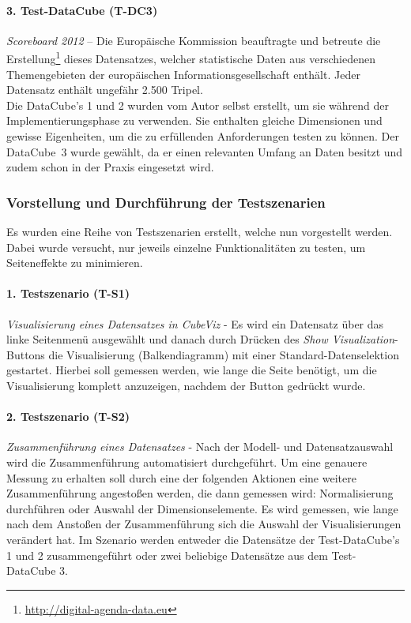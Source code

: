 \documentclass[11pt]{article}
\newcommand{\com}[1]{\marginpar{\em {\small{#1}}}} %
\begin{document}
\paragraph{3. Test-DataCube (T-DC3)} \textit{Scoreboard 2012}\com{T-DC3} -- Die Europäische Kommission beauftragte und betreute die Erstellung\footnote{\url{http://digital-agenda-data.eu}} dieses Datensatzes, welcher statistische Daten aus verschiedenen Themengebieten der europäischen Informationsgesellschaft enthält. Jeder Datensatz enthält ungefähr 2.500 Tripel. \\

\noindent
Die DataCube's 1 und 2 wurden vom Autor selbst erstellt, um sie während der Implementierungsphase zu verwenden. Sie enthalten gleiche Dimensionen und gewisse Eigenheiten, um die zu erfüllenden Anforderungen testen zu können. Der \mbox{DataCube 3} wurde gewählt, da er einen relevanten Umfang an Daten besitzt und zudem schon in der Praxis eingesetzt wird. 


%
%
%
\subsubsection{Vorstellung und Durchführung der Testszenarien}

Es wurden eine Reihe von Testszenarien erstellt, welche nun vorgestellt werden. Dabei wurde versucht, nur jeweils einzelne Funktionalitäten zu testen, um Seiteneffekte zu minimieren.

\paragraph{1. Testszenario (T-S1)} \textit{Visualisierung eines Datensatzes in CubeViz}\com{T-S1} - Es wird ein Datensatz über das linke Seitenmenü ausgewählt und danach durch Drücken des \textit{Show Visualization}-Buttons die Visualisierung (Balkendiagramm) mit einer Standard-Datenselektion gestartet. Hierbei soll gemessen werden, wie lange die Seite benötigt, um die Visualisierung komplett anzuzeigen, nachdem der Button gedrückt wurde. 


\paragraph{2. Testszenario (T-S2)} \textit{Zusammenführung eines Datensatzes}\com{T-S2} - Nach der Modell- und Datensatzauswahl wird die Zusammenführung automatisiert durchgeführt. Um eine genauere Messung zu erhalten soll durch eine der folgenden Aktionen eine weitere Zusammenführung angestoßen werden, die dann gemessen wird: Normalisierung durchführen oder Auswahl der Dimensionselemente. Es wird gemessen, wie lange nach dem Anstoßen der Zusammenführung sich die Auswahl der Visualisierungen verändert hat. Im Szenario werden entweder die Datensätze der Test-DataCube's 1 und 2 zusammengeführt oder zwei beliebige Datensätze aus dem Test-DataCube 3.
    
\end{document}
